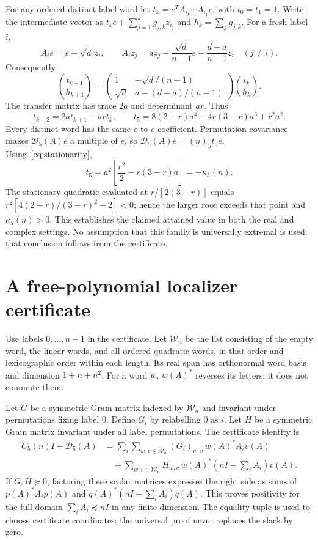 \documentclass[11pt]{article}
\newcommand{\D}{\mathcal D_5}
\newcommand{\W}{\mathcal W}
\begin{document}
For any ordered distinct-label word let
$t_k=e^TA_{i_k}\cdots A_{i_1}e$, with $t_0=t_1=1$.
Write the intermediate vector as $t_ke+\sum_{j=1}^k g_{j,k}z_{i_j}$
and $h_k=\sum_jg_{j,k}$. For a fresh label $i$,
\[
 A_i e=e+\sqrt d\,z_i,\qquad
 A_i z_j=az_j-\frac{\sqrt d}{n-1}e-\frac{d-a}{n-1}z_i\quad(j\ne i).
\]
Consequently
\[
 \binom{t_{k+1}}{h_{k+1}}=
 \begin{pmatrix}1&-\sqrt d/(n-1)\\
 \sqrt d&a-(d-a)/(n-1)\end{pmatrix}\binom{t_k}{h_k}.
\]
The transfer matrix has trace $2a$ and determinant $ar$. Thus
\begin{equation}\label{eq:recurrence}
 t_{k+2}=2at_{k+1}-ar t_k,
 \qquad
 t_5=8(2-r)a^4-4r(3-r)a^3+r^2a^2.
\end{equation}
Every distinct word has the same $e$-to-$e$ coefficient. Permutation
covariance makes $\D(A)e$ a multiple of $e$, so
$\D(A)e=(n)_5t_5e$. Using~\eqref{eq:stationarity},
\[
 t_5=a^2\left[\frac{r^2}{2}-r(3-r)a\right]=-\kappa_5(n).
\]
The stationary quadratic evaluated at $r/[2(3-r)]$ equals
$r^2[4(2-r)/(3-r)^2-2]<0$; hence the larger root exceeds that point
and $\kappa_5(n)>0$. This establishes the claimed attained value in
both the real and complex settings. No assumption that this family is
universally extremal is used: that conclusion follows from the certificate.

\section{A free-polynomial localizer certificate}\label{sec:localizer}
Use labels $0,\ldots,n-1$ in the certificate. Let $\W_n$ be the list
consisting of the empty word, the linear words, and all ordered quadratic
words, in that order and lexicographic order within each length.
Its real span has orthonormal word basis and dimension $1+n+n^2$.
For a word $w$, $w(A)^*$ reverses its letters; it does not commute them.

Let $G$ be a symmetric Gram matrix indexed by $\W_n$ and invariant
under permutations fixing label $0$. Define $G_i$ by relabelling $0$ as
$i$. Let $H$ be a symmetric Gram matrix invariant under all label
permutations. The certificate identity is
\begin{align}
 C_5(n)I+\D(A)
 &=\sum_i\sum_{w,v\in\W_n}(G_i)_{w,v}\,w(A)^*A_iv(A)\nonumber\\
 &\quad+\sum_{w,v\in\W_n}H_{w,v}\,
 w(A)^*\left(nI-\sum_iA_i\right)v(A).\label{eq:localizer}
\end{align}
If $G,H\succeq0$, factoring these scalar matrices expresses the right
side as sums of $p(A)^*A_ip(A)$ and
$q(A)^*(nI-\sum_iA_i)q(A)$. This proves positivity for the full domain
$\sum_iA_i\preceq nI$ in any finite dimension. The equality tuple is
used to choose certificate coordinates; the universal proof never replaces
the slack by zero.
\end{document}
